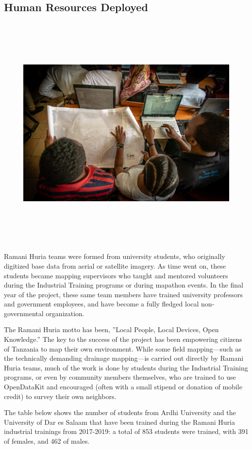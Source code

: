 \documentclass[a4paper,12pt,twoside]{article}
\begin{document}
\subsection{Human Resources Deployed}
\begin{figure}[h!]
	\centering
	\includegraphics[width=\textwidth, height=12cm]{images/Map_production.JPG}
\end{figure}
\begin{multicols}{2}
Ramani Huria teams were formed from university students, who originally digitized base data from aerial or satellite imagery.  As time went on, these students became mapping  supervisors who taught and mentored volunteers during the Industrial Training programs or during mapathon events. In the final year of the project, these same team members have trained university professors and government employees, and have become a fully fledged local non-governmental organization. 

The Ramani Huria motto has been, ”Local People, Local Devices, Open Knowledge.” The key to the success of the project has been empowering citizens of Tanzania to map their own environment. While some field mapping—such as the technically demanding drainage mapping—is carried out directly by Ramani Huria teams, much of the work is done by students during the Industrial Training programs, or even by community members themselves, who are trained to use OpenDataKit and encouraged (often with a small stipend or donation of mobile credit) to survey their own neighbors.

The table below shows the number of students from Ardhi University and the University of Dar es Salaam that have been trained during the Ramani Huria industrial trainings from 2017-2019: a total of 853 students were trained, with 391 of females, and 462 of males.
\end{multicols}
\end{document}
